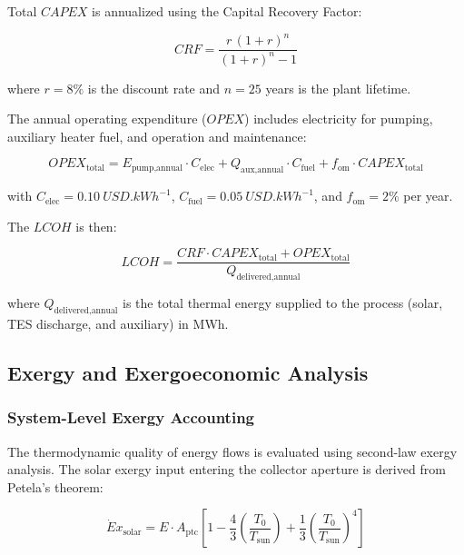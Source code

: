 \documentclass[11pt,review,3p]{elsarticle}
\begin{document}
Total $CAPEX$ is annualized using the Capital Recovery Factor:

\begin{equation}
    CRF = \frac{r\,(1 + r)^{n}}{(1 + r)^{n} - 1}
    \label{eq:crf}
\end{equation}

where $r = 8\%$ is the discount rate and $n = 25$ years is the plant lifetime.

The annual operating expenditure ($OPEX$) includes electricity for pumping, auxiliary heater fuel, and operation and maintenance:

\begin{equation}
    OPEX_{\text{total}} = E_{\text{pump,annual}} \cdot C_{\text{elec}} + Q_{\text{aux,annual}} \cdot C_{\text{fuel}} + f_{\text{om}} \cdot CAPEX_{\text{total}}
    \label{eq:opex}
\end{equation}

with $C_{\text{elec}} = \SI{0.10}{USD.kWh^{-1}}$, $C_{\text{fuel}} = \SI{0.05}{USD.kWh^{-1}}$, and $f_{\text{om}} = 2\%$ per year.

The $LCOH$ is then:

\begin{equation}
    LCOH = \frac{CRF \cdot CAPEX_{\text{total}} + OPEX_{\text{total}}}{Q_{\text{delivered,annual}}}
    \label{eq:lcoh}
\end{equation}

where $Q_{\text{delivered,annual}}$ is the total thermal energy supplied to the process (solar, TES discharge, and auxiliary) in \si{MWh}.

\subsection{Exergy and Exergoeconomic Analysis}
\label{sec:exergy}

\subsubsection{System-Level Exergy Accounting}
\label{sec:sys_exergy}

The thermodynamic quality of energy flows is evaluated using second-law exergy analysis. The solar exergy input entering the collector aperture is derived from Petela's theorem:

\begin{equation}
    \dot{E}x_{\text{solar}} = E \cdot A_{\text{ptc}} \left[ 1 - \frac{4}{3}\left(\frac{T_0}{T_{\text{sun}}}\right) + \frac{1}{3}\left(\frac{T_0}{T_{\text{sun}}}\right)^{4} \right]
    \label{eq:petela}
\end{equation}
\end{document}
